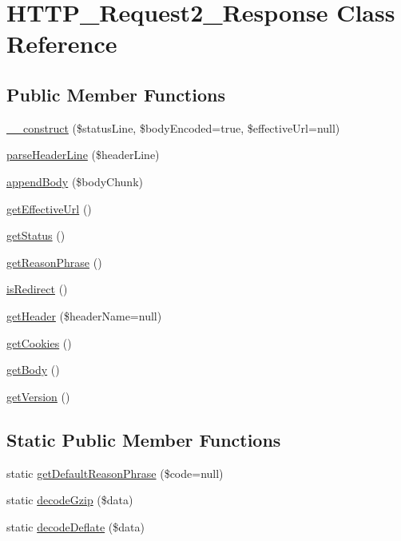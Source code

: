 \hypertarget{classHTTP__Request2__Response}{\section{H\-T\-T\-P\-\_\-\-Request2\-\_\-\-Response Class Reference}
\label{classHTTP__Request2__Response}
}
\subsection*{Public Member Functions}
\begin{DoxyCompactItemize}
\item 
\hyperlink{classHTTP__Request2__Response_aaaa2f628e7dbfecfeb775c9ee6c12bdb}{\-\_\-\-\_\-construct} (\$status\-Line, \$body\-Encoded=true, \$effective\-Url=null)
\item 
\hyperlink{classHTTP__Request2__Response_a04cced85d4e024e5f41bb326aeba4bb8}{parse\-Header\-Line} (\$header\-Line)
\item 
\hyperlink{classHTTP__Request2__Response_a9c058efa93fa093f9e2ea3899aaafd81}{append\-Body} (\$body\-Chunk)
\item 
\hyperlink{classHTTP__Request2__Response_ac62d21f48b31db496403da74ec9a9635}{get\-Effective\-Url} ()
\item 
\hyperlink{classHTTP__Request2__Response_a624920600f1cff1d72493c74e945ace3}{get\-Status} ()
\item 
\hyperlink{classHTTP__Request2__Response_aabc673a3430ee9b8ad0e29275b31c655}{get\-Reason\-Phrase} ()
\item 
\hyperlink{classHTTP__Request2__Response_a9f99e1beb096712a7b1ebda78b638b06}{is\-Redirect} ()
\item 
\hyperlink{classHTTP__Request2__Response_a4fcafd1538662af1415ccf12cae68c62}{get\-Header} (\$header\-Name=null)
\item 
\hyperlink{classHTTP__Request2__Response_a1c8c23d204f797dd18a31aa5a9c50414}{get\-Cookies} ()
\item 
\hyperlink{classHTTP__Request2__Response_a2aa534b9ea2994761e3b9260908ad678}{get\-Body} ()
\item 
\hyperlink{classHTTP__Request2__Response_acf2961ff04baa2610df8ca30ea5313b0}{get\-Version} ()
\end{DoxyCompactItemize}
\subsection*{Static Public Member Functions}
\begin{DoxyCompactItemize}
\item 
static \hyperlink{classHTTP__Request2__Response_ae6a45aaf10437d67b4710d61702d9819}{get\-Default\-Reason\-Phrase} (\$code=null)
\item 
static \hyperlink{classHTTP__Request2__Response_aa599a743d6dfcdec596d58f359b22566}{decode\-Gzip} (\$data)
\item 
static \hyperlink{classHTTP__Request2__Response_ae43f4b1062afa9036c71e3c506d5979e}{decode\-Deflate} (\$data)
\end{DoxyCompactItemize}
